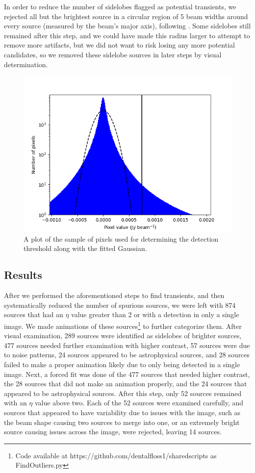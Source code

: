 \documentclass[12pt]{article}
\begin{document}
In order to reduce the number of sidelobes flagged as potential transients, we rejected all but the brightest source in a circular region of 5 beam widths around every source (measured by the beam's major axis), following \citet{commensal1}. Some sidelobes still remained after this step, and we could have made this radius larger to attempt to remove more artifacts, but we did not want to risk losing any more potential candidates, so we removed these sidelobe sources in later steps by visual determination.
\begin{figure}
	\includegraphics[width=\columnwidth]{pixels.png}
	\caption{A plot of the sample of pixels used for determining the detection threshold along with the fitted Gaussian.}
	\label{fig:pixels}
\end{figure}
\subsection{Results}
\label{sec:results3}

After we performed the aforementioned steps to find transients, and then systematically reduced the number of spurious sources, we were left with 874 sources that had an $\eta$ value greater than 2 or with a detection in only a single image. We made animations of these sources\footnote{Code available at https://github.com/dentalfloss1/sharedscripts as FindOutliers.py} to further categorize them. After visual examination, 289 sources were identified as sidelobes of brighter sources, 477 sources needed further examination with higher contrast, 57 sources were due to noise patterns, 24 sources appeared to be astrophysical sources, and 28 sources failed to make a proper animation likely due to only being detected in a single image. Next, a forced fit was done of the 477 sources that needed higher contrast, the 28 sources that did not make an animation properly, and the 24 sources that appeared to be astrophysical sources. After this step, only 52 sources remained with an $\eta$ value above two. Each of the 52 sources were examined carefully, and sources that appeared to have variability due to issues with the image, such as the beam shape causing two sources to merge into one, or an extremely bright source causing issues across the image, were rejected, leaving 14 sources. 
\end{document}
